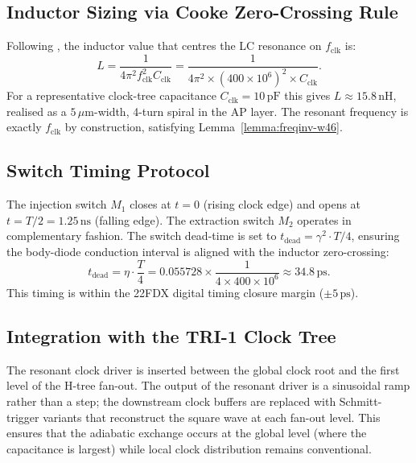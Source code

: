 \subsection{Inductor Sizing via Cooke Zero-Crossing Rule}

Following \citep{cooke_ieee_2003}, the inductor value that centres the LC
resonance on $f_{\mathrm{clk}}$ is:
\begin{equation}\label{eq:L-sizing}
  L = \frac{1}{4 \pi^{2} f_{\mathrm{clk}}^{2} C_{\mathrm{clk}}}
    = \frac{1}{4 \pi^{2} \times (400 \times 10^{6})^{2} \times C_{\mathrm{clk}}}.
\end{equation}
For a representative clock-tree capacitance $C_{\mathrm{clk}} = 10\,\text{pF}$
this gives $L \approx 15.8\,\text{nH}$, realised as a $5\,\mu\text{m}$-width,
4-turn spiral in the AP layer.
The resonant frequency is exactly $f_{\mathrm{clk}}$ by construction, satisfying
Lemma~\ref{lemma:freqinv-w46}.

\subsection{Switch Timing Protocol}

The injection switch $M_1$ closes at $t = 0$ (rising clock edge) and opens at
$t = T/2 = 1.25\,\text{ns}$ (falling edge).
The extraction switch $M_2$ operates in complementary fashion.
The switch dead-time is set to $t_{\mathrm{dead}} = \gamma^{2} \cdot T / 4$,
ensuring the body-diode conduction interval is aligned with the inductor
zero-crossing:
\begin{equation}\label{eq:tdead}
  t_{\mathrm{dead}} = \eta \cdot \frac{T}{4}
  = 0.055728 \times \frac{1}{4 \times 400 \times 10^{6}}
  \approx 34.8\,\text{ps}.
\end{equation}
This timing is within the 22FDX digital timing closure margin ($\pm 5\,\text{ps}$).

\subsection{Integration with the TRI-1 Clock Tree}

The resonant clock driver is inserted between the global clock root and the
first level of the H-tree fan-out.
The output of the resonant driver is a sinusoidal ramp rather than a step;
the downstream clock buffers are replaced with Schmitt-trigger variants that
reconstruct the square wave at each fan-out level.
This ensures that the adiabatic exchange occurs at the global level (where
the capacitance is largest) while local clock distribution remains
conventional.

